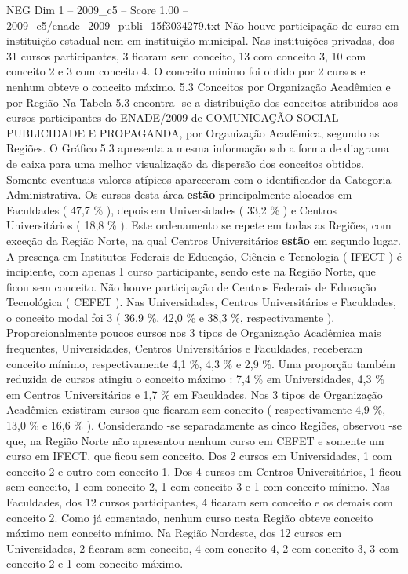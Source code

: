 \begin{textsample}{NEG Dim 1 – 2009\_c5 – Score 1.00 – 2009\_c5/enade\_2009\_publi\_15f3034279.txt}
Não houve participação de curso em instituição estadual nem em instituição municipal.
Nas instituições privadas, dos 31 cursos participantes, 3 ficaram sem conceito, 13 com conceito 3, 10 com conceito 2 e 3 com conceito 4.
O conceito mínimo foi obtido por 2 cursos e nenhum obteve o conceito máximo. 5.3 Conceitos por Organização Acadêmica e por Região Na Tabela 5.3 encontra -se a distribuição dos conceitos atribuídos aos cursos participantes do ENADE/2009 de COMUNICAÇÃO SOCIAL – PUBLICIDADE E PROPAGANDA, por Organização Acadêmica, segundo as Regiões.
O Gráfico 5.3 apresenta a mesma informação sob a forma de diagrama de caixa para uma melhor visualização da dispersão dos conceitos obtidos.
Somente eventuais valores atípicos apareceram com o identificador da Categoria Administrativa.
Os cursos desta área \textbf{estão} principalmente alocados em Faculdades ( 47,7 \% ), depois em Universidades ( 33,2 \% ) e Centros Universitários ( 18,8 \% ).
Este ordenamento se repete em todas as Regiões, com exceção da Região Norte, na qual Centros Universitários \textbf{estão} em segundo lugar.
A presença em Institutos Federais de Educação, Ciência e Tecnologia ( IFECT ) é incipiente, com apenas 1 curso participante, sendo este na Região Norte, que ficou sem conceito.
Não houve participação de Centros Federais de Educação Tecnológica ( CEFET ).
Nas Universidades, Centros Universitários e Faculdades, o conceito modal foi 3 ( 36,9 \%, 42,0 \% e 38,3 \%, respectivamente ).
Proporcionalmente poucos cursos nos 3 tipos de Organização Acadêmica mais frequentes, Universidades, Centros Universitários e Faculdades, receberam conceito mínimo, respectivamente 4,1 \%, 4,3 \% e 2,9 \%.
Uma proporção também reduzida de cursos atingiu o conceito máximo : 7,4 \% em Universidades, 4,3 \% em Centros Universitários e 1,7 \% em Faculdades.
Nos 3 tipos de Organização Acadêmica existiram cursos que ficaram sem conceito ( respectivamente 4,9 \%, 13,0 \% e 16,6 \% ).
Considerando -se separadamente as cinco Regiões, observou -se que, na Região Norte não apresentou nenhum curso em CEFET e somente um curso em IFECT, que ficou sem conceito.
Dos 2 cursos em Universidades, 1 com conceito 2 e outro com conceito 1.
Dos 4 cursos em Centros Universitários, 1 ficou sem conceito, 1 com conceito 2, 1 com conceito 3 e 1 com conceito mínimo.
Nas Faculdades, dos 12 cursos participantes, 4 ficaram sem conceito e os demais com conceito 2.
Como já comentado, nenhum curso nesta Região obteve conceito máximo nem conceito mínimo.
Na Região Nordeste, dos 12 cursos em Universidades, 2 ficaram sem conceito, 4 com conceito 4, 2 com conceito 3, 3 com conceito 2 e 1 com conceito máximo.

\end{textsample}
